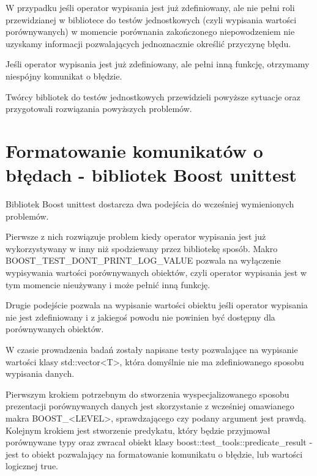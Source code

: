 \documentclass[12pt,a4paper,notitlepage]{report}
\begin{document}
W przypadku jeśli operator wypisania jest już zdefiniowany, ale nie pełni roli przewidzianej w bibliotece do testów jednostkowych (czyli wypisania wartości porównywanych) w momencie porównania zakończonego niepowodzeniem nie uzyskamy informacji pozwalających jednoznacznie określić przyczynę błędu.

Jeśli operator wypisania jest już zdefiniowany, ale pełni inną funkcję, otrzymamy niespójny komunikat o błędzie.

Twórcy bibliotek do testów jednostkowych przewidzieli powyższe sytuacje oraz przygotowali rozwiązania powyższych problemów.

\section{Formatowanie komunikatów o błędach - bibliotek Boost unittest}

Bibliotek Boost unittest dostarcza dwa podejścia do wcześniej wymienionych problemów.

Pierwsze z nich rozwiązuje problem kiedy operator wypisania jest już wykorzystywany w inny niż spodziewany przez bibliotekę sposób. Makro BOOST{\_}TEST{\_}DONT{\_}PRINT{\_}LOG{\_}VALUE pozwala na wyłączenie wypisywania wartości porównywanych obiektów, czyli operator wypisania jest w tym momencie nieużywany i może pełnić inną funkcję.

			

Drugie podejście pozwala na wypisanie wartości obiektu jeśli operator wypisania nie jest zdefiniowany i z jakiegoś powodu nie powinien być dostępny dla porównywanych obiektów.

W czasie prowadzenia badań zostały napisane testy pozwalające na wypisanie wartości klasy std::vector<T>, która domyślnie nie ma zdefiniowanego sposobu wypisania danych.

Pierwszym krokiem potrzebnym do stworzenia wyspecjalizowanego sposobu prezentacji porównywanych danych jest skorzystanie z wcześniej omawianego makra BOOST{\_}<LEVEL>, sprawdzającego czy podany argument jest prawdą. Kolejnym krokiem jest stworzenie predykatu, który będzie przyjmował porównywane typy oraz zwracał obiekt klasy boost::test{\_}tools::predicate{\_}result - jest to obiekt pozwalający na formatowanie komunikatu o błędzie, lub wartości logicznej true.
\end{document}
